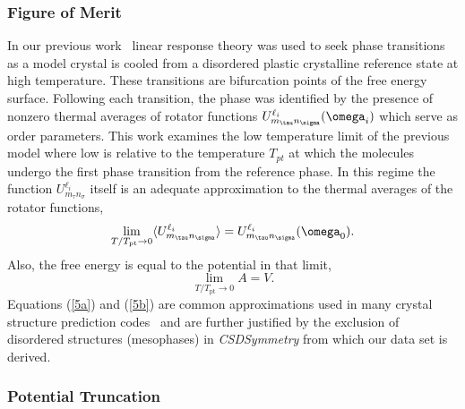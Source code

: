 \documentclass[preprint]{iucr}              %
\newcommand{\mb}[1]{\ensuremath{\mbox{\boldmath $ #1 $}}}
\newcommand{\av}[1]{\ensuremath{\langle #1 \rangle}}
\begin{document}
\subsubsection{Figure of Merit}

In our previous work~\cite{Keith04c,Mettes04} linear response theory
was used to seek phase transitions as a model crystal is cooled from
a disordered plastic crystalline reference state at high temperature. These
transitions are bifurcation points of the free energy surface.
Following each transition, the phase was identified by the presence
of nonzero thermal averages of rotator functions $U^{\ell_i}_{m_\tau
n_\sigma}(\mb{\omega}_i)$ which serve as order parameters. This work
examines the low temperature limit of the previous model where low
is relative to the temperature $T_{pt}$ at which the molecules
undergo the first
phase transition from the reference phase. 
In this regime the function $U^{\ell_i}_{m_\tau n_\sigma}$ itself is
an adequate approximation to the thermal averages of the rotator
functions,
\begin{equation}\label{5a}
\lim_{T/T_{\mathrm{pt}}\rightarrow 0}\av{U^{\ell_i}_{m_\tau
n_\sigma}}=U^{\ell_i}_{m_\tau n_\sigma}(\mb{\omega}_0).
\end{equation}
Also, the free energy is equal to the potential in that limit,
\begin{equation}\label{5b}
\lim_{T/T_{\mathrm{pt}}\rightarrow 0}A=V.
\end{equation}
Equations (\ref{5a}) and (\ref{5b}) are common approximations used in
many crystal structure prediction codes~\cite{Verwer98} and are
further justified by the exclusion of disordered structures (mesophases) in
\emph{CSDSymmetry} from which our data set is derived.

\subsubsection{Potential Truncation}
\label{truncation}
\end{document}
